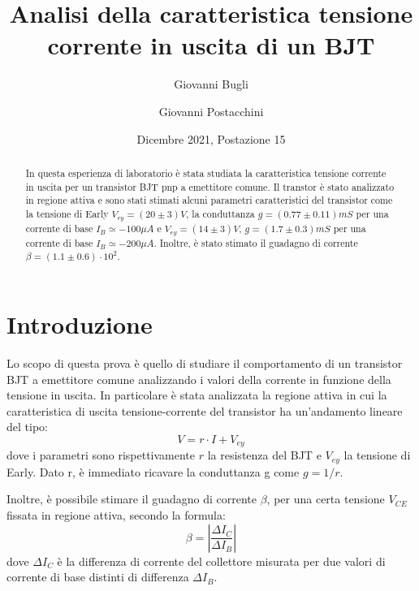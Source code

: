 \documentclass[a4paper,11pt]{article}
\begin{document}
\title{Analisi della caratteristica tensione corrente in uscita di un BJT}
\author{Giovanni Bugli \and Giovanni Postacchini}
\date{Dicembre 2021, Postazione 15}

\maketitle
\begin{abstract}
  In questa esperienza di laboratorio è stata studiata la caratteristica tensione corrente in uscita per un transistor BJT pnp a emettitore comune. Il transtor è stato analizzato in regione attiva e sono stati stimati alcuni parametri caratteristici del transistor come la tensione di Early $V_{ey} = (20 \pm 3) V$, la conduttanza $g = (0.77 \pm 0.11) mS$ per una corrente di base $I_B \simeq -100 \mu A$ e $V_{ey} = (14 \pm 3) V$, $g = (1.7 \pm 0.3) mS$ per una corrente di base $I_B \simeq -200 \mu A$. Inoltre, è stato stimato il guadagno di corrente $\beta = (1.1 \pm 0.6) \cdot 10^2$.
\end{abstract}

\section{Introduzione}
Lo scopo di questa prova è quello di studiare il comportamento di un transistor BJT a emettitore comune analizzando i valori della corrente in funzione della tensione in uscita. In particolare è stata analizzata la regione  attiva in cui la caratteristica di uscita tensione-corrente del transistor ha un'andamento lineare del tipo:
\begin{equation}
  V = r \cdot I + V_{ey}
\end{equation}
dove i parametri sono rispettivamente $r$ la resistenza del BJT e $V_{ey}$ la tensione di Early. Dato r, è immediato ricavare la conduttanza g come $g = 1/r.$

Inoltre, è possibile stimare il guadagno di corrente $\beta$, per una certa tensione $V_{CE}$ fissata in regione attiva, secondo la formula:
\begin{equation}
  \beta = |\frac{\Delta I_C}{\Delta I_B}|
\end{equation}
dove $\Delta I_C$ è la differenza di corrente del collettore misurata per due valori di corrente di base distinti di differenza $\Delta I_B$.
\end{document}
